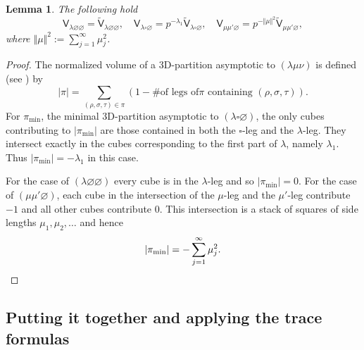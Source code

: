 \documentclass[12pt]{amsart}
\newtheorem{lemma}[theorem]{Lemma}
\theoremstyle{definition}
\newcommand{\sfV}{\mathsf{V}}
\newcommand{\sfVtilde}{\widetilde{\mathsf{V}}}
\renewcommand{\emptyset}{\varnothing}
\newcommand{\bx}{\square}
\begin{document}
\begin{lemma}\label{lem: normalized vertex in terms of usual vertex}
The following hold 
\[
\sfV_{\lambda \emptyset \emptyset} =\sfVtilde_{\lambda \emptyset
\emptyset}, \quad \sfV_{\lambda \bx \emptyset} = p^{-\lambda_{1}}
\sfVtilde_{\lambda \bx \emptyset}, \quad \sfV_{\mu \mu' \emptyset}
=p^{-\Vert \mu \Vert^{2}} \sfVtilde_{\mu \mu' \emptyset},
\]
where $\Vert \mu \Vert^{2}:= \sum_{j=1}^{\infty} \mu_{j}^{2}$.
\end{lemma}
\begin{proof}
The normalized volume of a 3D-partition asymptotic to $(\lambda \mu
\nu )$ is defined (see \cite[page~2]{Bryan-Kool-Young}) by
\[
|\pi | = \sum_{(\rho ,\sigma ,\tau )\in \pi} (1-\text{\# of legs of
$\pi$ containing $(\rho ,\sigma ,\tau )$}) .
\]
For $\pi_{\min}$, the minimal 3D-partition asymptotic to $(\lambda \bx
\emptyset)$, the only cubes contributing to $|\pi_{\min}|$ are those
contained in both the $\bx$-leg and the $\lambda$-leg. They intersect
exactly in the cubes corresponding to the first part of $\lambda$,
namely $\lambda_{1}$. Thus $|\pi_{\min}|=-\lambda_{1}$ in this case.

For the case of $(\lambda \emptyset \emptyset )$ every cube is in the
$\lambda$-leg and so $|\pi_{\min}|=0$. For the case of $(\mu \mu'
\emptyset )$, each cube in the intersection of the $\mu$-leg and the
$\mu '$-leg contribute $-1$ and all other cubes contribute 0. This
intersection is a stack of squares of side lengths
$\mu_{1},\mu_{2},\dotsc$ and hence
\[
|\pi_{\min}| = -\sum_{j=1}^{\infty} \mu_{j}^{2}. \qedhere
\]
\end{proof}

\subsection{Putting it together and applying the trace formulas}
\end{document}
